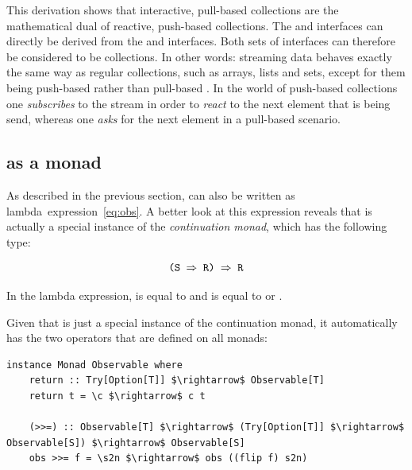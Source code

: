 
This derivation shows that interactive, pull-based collections are the mathematical dual of reactive, push-based collections. The \obs and \obv interfaces can directly be derived from the \ieb and \ier interfaces. Both sets of interfaces can therefore be considered to be collections. In other words: streaming data behaves exactly the same way as regular collections, such as arrays, lists and sets, except for them being push-based rather than pull-based \cite{meijer2012-YMIAD, meijer2010-Observable}. In the world of push-based collections one \emph{subscribes} to the stream in order to \emph{react} to the next element that is being send, whereas one \emph{asks} for the next element in a pull-based scenario.

\subsection{\obs as a monad}
\label{subsec:obs-monad}
As described in the previous section, \obs can also be written as lambda~expression~\ref{eq:obs}. A better look at this expression reveals that \obs is actually a special instance of the \textit{continuation monad}, which has the following type:

\begin{equation} \label{eq:cont}
\code{(S $\Rightarrow$ R) $\Rightarrow$ R}
\end{equation}

In the \obs lambda expression,  is equal to  and  is equal to \code{()} or .

Given that \obs is just a special instance of the continuation monad, it automatically has the two operators that are defined on all monads:

\begin{minipage}{\linewidth}
\begin{lstlisting}[style=HaskellStyle, caption={\obs as monad (in Haskell)}, label={lst:obs-monad}]
instance Monad Observable where
    return :: Try[Option[T]] $\rightarrow$ Observable[T]
    return t = \c $\rightarrow$ c t

    (>>=) :: Observable[T] $\rightarrow$ (Try[Option[T]] $\rightarrow$ Observable[S]) $\rightarrow$ Observable[S]
    obs >>= f = \s2n $\rightarrow$ obs ((flip f) s2n)
\end{lstlisting}
\end{minipage}

